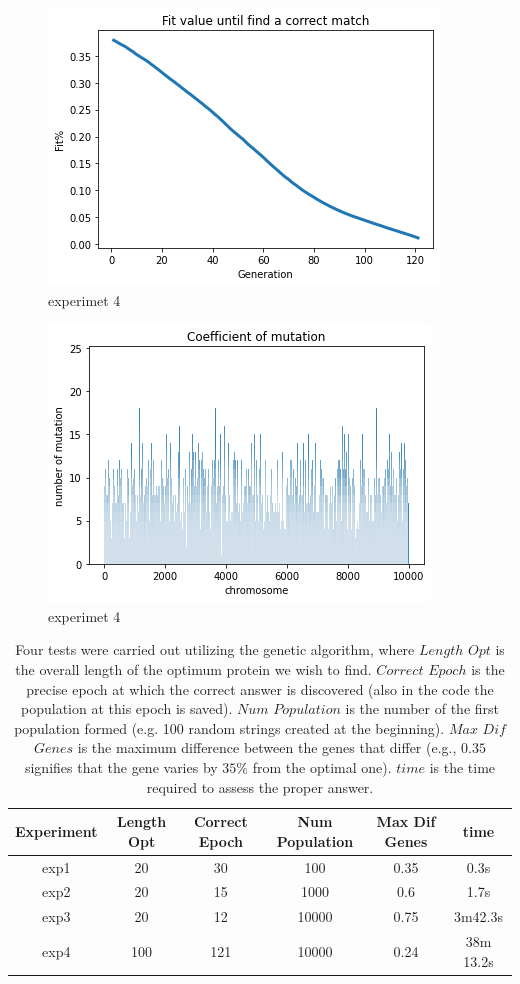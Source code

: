 \documentclass[letterpaper]{article} %
\begin{document}
\begin{figure}[h]
\centering
    \includegraphics[scale = 0.5]{fitpop10000v2.png}
    \caption{experimet 4}
\end{figure}
\begin{figure}[h]
 \centering
 \includegraphics[scale = 0.5]{histpop10000v2.png}
 \caption{experimet 4}
\end{figure}

\begin{table}[t]
\centering
\begin{tabular}{|c|c|c|c|c|c|}
        \hline
            Experiment & Length Opt & Correct Epoch & Num Population & Max Dif Genes & time \\
            \hline
            exp1& 20 & 30 & 100 & 0.35 & 0.3s \\
            exp2& 20 & 15 & 1000 & 0.6 & 1.7s \\
            exp3& 20 & 12 & 10000 & 0.75 & 3m42.3s\\
            exp4& 100 & 121 & 10000 & 0.24 & 38m 13.2s\\
            \hline
    \end{tabular}
    \caption{Four tests were carried out utilizing the genetic algorithm, where $Length$ $Opt$ is the overall length of the optimum protein we wish to find. $Correct$ $Epoch$ is the precise epoch at which the correct answer is discovered (also in the code the population at this epoch is saved). $Num$ $Population$ is the number of the first population formed (e.g. 100 random strings created at the beginning). $Max$ $Dif$ $Genes$ is the maximum difference between the genes that differ (e.g., $0.35$ signifies that the gene varies by $35\%$ from the optimal one). $time$ is the time required to assess the proper answer.}
\end{table}
\end{document}
